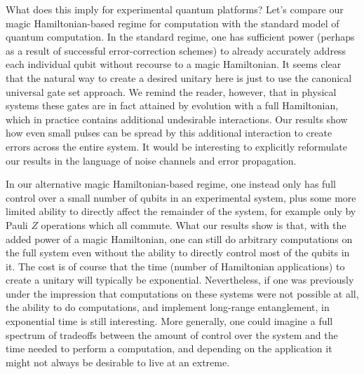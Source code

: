 \documentclass[12pt, a4-paper]{amsart}
\numberwithin{equation}{section}
\begin{document}
What does this imply for experimental quantum platforms? Let's compare our magic Hamiltonian-based regime for computation with the standard model of quantum computation. In the standard regime, one has sufficient power (perhaps as a result of successful error-correction schemes) to already accurately address each individual qubit without recourse to a magic Hamiltonian. It seems clear that the natural way to create a desired unitary here is just to use the canonical universal gate set approach. We remind the reader, however, that in physical systems these gates are in fact attained by evolution with a full Hamiltonian, which in practice contains additional undesirable interactions. Our results show how even small pulses can be spread by this additional interaction to create errors across the entire system. It would be interesting to explicitly reformulate our results in the language of noise channels and error propagation.

In our alternative magic Hamiltonian-based regime, one instead only has full control over a small number of qubits in an experimental system, plus some more limited ability to directly affect the remainder of the system, for example only by Pauli $Z$ operations which all commute. What our results show is that, with the added power of a magic Hamiltonian, one can still do arbitrary computations on the full system even without the ability to directly control most of the qubits in it. The cost is of course that the time (number of Hamiltonian applications) to create a unitary will typically be exponential. Nevertheless, if one was previously under the impression that computations on these systems were not possible at all, the ability to do computations, and implement long-range entanglement, in exponential time is still interesting.
More generally, one could imagine a full spectrum of tradeoffs between the amount of control over the system and the time needed to perform a computation, and depending on the application it might not always be desirable to live at an extreme. 






\appendix
\end{document}
